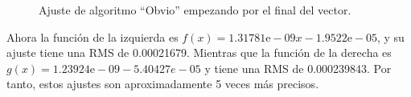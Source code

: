 \documentclass[a4]{article}
\begin{document}
\begin{figure}[H]
  \centering
  \caption{Ajuste de algoritmo ``Obvio'' empezando por el final del
    vector.}
  \label{fig:ajust-sol-obvio-inverso}
\end{figure}

Ahora la función de la izquierda es
$f(x)=1.31781\mbox{e}-09x-1.9522\mbox{e}-05$, y su ajuste tiene una
RMS de 0.00021679. Mientras que la función de la derecha es
$g(x)=1.23924\mbox{e}-09-5.40427e-05$ y tiene una RMS de
0.000239843. Por tanto, estos ajustes son aproximadamente 5 veces más
precisos.
\end{document}
